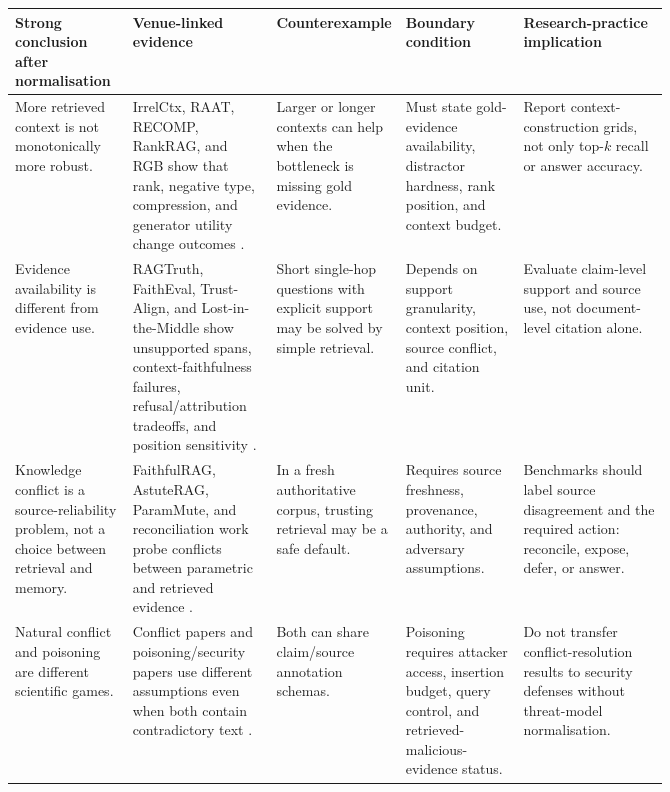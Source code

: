 \begin{table}[t]
\centering
\scriptsize
\renewcommand{\arraystretch}{0.82}
\begin{tabularx}{\linewidth}{>{\raggedright\arraybackslash}p{0.18\linewidth}>{\raggedright\arraybackslash}p{0.22\linewidth}>{\raggedright\arraybackslash}p{0.18\linewidth}>{\raggedright\arraybackslash}p{0.18\linewidth}X}
\toprule
\textbf{Strong conclusion after normalisation} & \textbf{Venue-linked evidence} & \textbf{Counterexample} & \textbf{Boundary condition} & \textbf{Research-practice implication} \\
\midrule
More retrieved context is not monotonically more robust. & IrrelCtx, RAAT, RECOMP, RankRAG, and RGB show that rank, negative type, compression, and generator utility change outcomes \citep{irrelevantContext2023,raat2024,recomp2024,venueExtra014,rgb2023}. & Larger or longer contexts can help when the bottleneck is missing gold evidence. & Must state gold-evidence availability, distractor hardness, rank position, and context budget. & Report context-construction grids, not only top-$k$ recall or answer accuracy. \\
Evidence availability is different from evidence use. & RAGTruth, FaithEval, Trust-Align, and Lost-in-the-Middle show unsupported spans, context-faithfulness failures, refusal/attribution tradeoffs, and position sensitivity \citep{ragTruth2024,rrag040,venueAcc001,liu2024lostmiddle}. & Short single-hop questions with explicit support may be solved by simple retrieval. & Depends on support granularity, context position, source conflict, and citation unit. & Evaluate claim-level support and source use, not document-level citation alone. \\
Knowledge conflict is a source-reliability problem, not a choice between retrieval and memory. & FaithfulRAG, AstuteRAG, ParamMute, and reconciliation work probe conflicts between parametric and retrieved evidence \citep{faithfulRAG2025,astuteRAG2025,rrag024,venueAcc027}. & In a fresh authoritative corpus, trusting retrieval may be a safe default. & Requires source freshness, provenance, authority, and adversary assumptions. & Benchmarks should label source disagreement and the required action: reconcile, expose, defer, or answer. \\
Natural conflict and poisoning are different scientific games. & Conflict papers and poisoning/security papers use different assumptions even when both contain contradictory text \citep{faithfulRAG2025,astuteRAG2025,poisonedRAG2024,rrag021,rrag017}. & Both can share claim/source annotation schemas. & Poisoning requires attacker access, insertion budget, query control, and retrieved-malicious-evidence status. & Do not transfer conflict-resolution results to security defenses without threat-model normalisation. \\

\end{tabularx}
\end{table}

